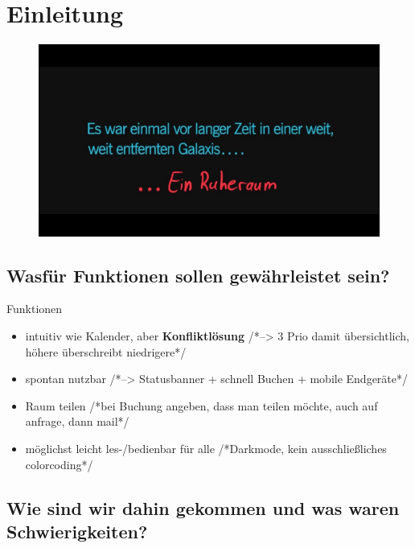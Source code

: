 \section{Einleitung}

\begin{frame}[plain]
    \thispagestyle{plain}
    \begin{figure}
        \centering
        \includegraphics[width=1\linewidth]{pictures/Galaxie}
        \label{fig:galaxie_weit_entfernt}
    \end{figure}
\end{frame}

\subsection[nötige Funktionen]{Wasfür Funktionen sollen gewährleistet sein?}

\begin{frame}{Funktionen}
    \begin{itemize}
        \item intuitiv wie Kalender, aber \textrightarrow \space \textbf{Konfliktlösung} /*--> 3 Prio damit übersichtlich, höhere überschreibt niedrigere*/
        \item spontan nutzbar /*--> Statusbanner + schnell Buchen + mobile Endgeräte*/
        \item Raum teilen /*bei Buchung angeben, dass man teilen möchte, auch auf anfrage, dann mail*/
        \item  möglichst leicht les-/bedienbar für alle /*Darkmode, kein ausschließliches colorcoding*/
    \end{itemize}
\end{frame}

\subsection[Werdegang und Schwierigkeiten]{Wie sind wir dahin gekommen und was waren Schwierigkeiten?}

